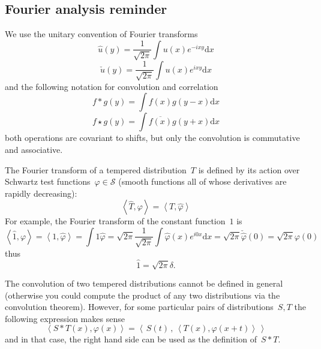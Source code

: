 \documentclass[a4paper]{article}           %
\newcommand{\1}{\mathbf{1}}
\newcommand{\ud}{\mathrm{d}}
\newcommand{\pairing}[2]{\left\langle #1,#2\right\rangle}
\begin{document}



\clearpage
\subsection{Fourier analysis reminder}

We use the unitary convention of Fourier transforms
$$ \hat{u}(y)=\frac{1}{\sqrt{2\pi}}\int u(x)e^{-ixy}\ud x $$
$$ \check{u}(y)=\frac{1}{\sqrt{2\pi}}\int u(x)e^{ixy}\ud x $$
and the following notation for convolution and correlation
$$ f*g(y)=\int f(x)g(y-x)\ud x $$
$$ f\star g(y)=\int \overline{f(x)}g(y+x)\ud x $$
both operations are covariant to shifts, but only the
convolution is commutative and associative.


The Fourier transform of a tempered distribution~$T$ is defined by its action
over Schwartz test functions~$\varphi\in\mathcal{S}$ (smooth functions
all of whose derivatives are rapidly decreasing):
$$
\pairing{\hat{T}}\varphi
=
\pairing{T}{\hat{\varphi}}
$$
For example, the Fourier transform of the constant function~$1$ is
$$
\pairing{\hat 1}{\varphi}
=
\pairing{1}{\hat \varphi}
=
\int 1\hat\varphi
=
\sqrt{2\pi}\frac{1}{\sqrt{2\pi}}\int \hat\varphi(x)e^{i0x}\ud x
=\sqrt{2\pi}\check{\hat{\varphi}}(0)
=\sqrt{2\pi}\varphi(0)
$$
thus
\begin{equation}
	\hat 1=\sqrt{2\pi}\delta.
	\label{eq:dirac}
\end{equation}

The convolution of two tempered distributions cannot be defined in general
(otherwise you could compute the product of any two distributions via the
convolution theorem).  However, for some particular pairs of
distributions~$S,T$ the following expression makes sense
$$
\pairing{S*T(x)}{\varphi(x)}
=
\pairing{\,S(t)\,}{\,\pairing{T(x)}{\varphi(x+t)}\,}
$$
and in that case, the right hand side can be used as the definition of~$S*T$.
\end{document}
